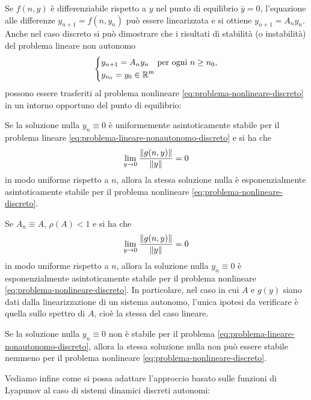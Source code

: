 \noindent Se $f(n,y)$ è differenziabile rispetto a $y$ nel punto di equilibrio
$\bar{y} = 0$, l'equazione alle differenze $y_{n+1} = f(n,y_n)$ può essere
linearizzata e si ottiene $y_{n+1} = A_n y_n$.
Anche nel caso discreto si può dimostrare che i risultati di stabilità
(o instabilità) del problema lineare non autonomo
\begin{equation} \label{eq:problema-lineare-nonautonomo-discreto}
\left\{
\begin{aligned}
& y_{n+1} = A_n y_n \quad \text{per ogni $n \geq n_0$}, \\
& y_{n_0} = y_0 \in \mathbb{R}^m
\end{aligned}
\right.
\end{equation}
possono essere trasferiti al problema nonlineare
\eqref{eq:problema-nonlineare-discreto} in un intorno opportuno del punto
di equilibrio:

\begin{teor}
Se la soluzione nulla $y_n \equiv 0$ è uniformemente asintoticamente
stabile per il problema lineare \eqref{eq:problema-lineare-nonautonomo-discreto}
e si ha che
\[
\lim_{y \to 0} \frac{\left\lVert g(n,y)\right\rVert}{\left\lVert y\right\rVert} = 0
\]
in modo uniforme rispetto a $n$, allora la stessa soluzione nulla
è esponenzialmente asintoticamente stabile per il problema nonlineare
\eqref{eq:problema-nonlineare-discreto}.
\end{teor}

\begin{teor}[Perron]
Se $A_n \equiv A$, $\rho(A) < 1$ e si ha che
\[
\lim_{y \to 0} \frac{\left\lVert g(n,y)\right\rVert}{\left\lVert y\right\rVert} = 0
\]
in modo uniforme rispetto a $n$, allora la soluzione nulla $y_n \equiv 0$
è esponenzialmente asintoticamente stabile per il problema nonlineare
\eqref{eq:problema-nonlineare-discreto}. In particolare, nel caso in cui
$A$ e $g(y)$ siano dati dalla linearizzazione di un sistema autonomo,
l'unica ipotesi da verificare è quella sullo spettro di $A$,
cioè la stessa del caso lineare.
\end{teor}

\begin{teor}
Se la soluzione nulla $y_n \equiv 0$ non è stabile per il problema
\eqref{eq:problema-lineare-nonautonomo-discreto}, allora la stessa soluzione
nulla non può essere stabile nemmeno per il problema nonlineare
\eqref{eq:problema-nonlineare-discreto}.
\end{teor}

\noindent Vediamo infine come si possa adattare l'approccio basato sulle funzioni
di Lyapunov al caso di sistemi dinamici discreti autonomi:

